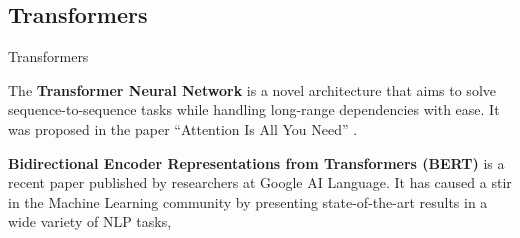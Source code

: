 \documentclass[10pt]{beamer}
\newcommand{\1}{
	\setbeamertemplate{background}{
		\texttt{[image: img/1]}
		\tikz[overlay] \fill[fill opacity=0.75,fill=white] (0,0) rectangle (-\paperwidth,\paperheight);
	}
}
\begin{document}
\subsection{ Transformers }



\begin{frame}{Transformers}{}
	
	\begin{block}{}
		The \textbf{Transformer Neural Network} is a novel architecture that aims to solve sequence-to-sequence tasks while handling long-range dependencies with ease. It was proposed in the paper ``Attention Is All You Need'' \cite{vaswani2017attention}. 
	\end{block}

	\begin{block}{}
		\textbf{Bidirectional Encoder Representations from Transformers (BERT)} \cite{devlin2018bert} is a recent paper published by researchers at Google AI Language. It has caused a stir in the Machine Learning community by presenting state-of-the-art results in a wide variety of NLP tasks,
	\end{block}
	
\end{frame}
\end{document}
